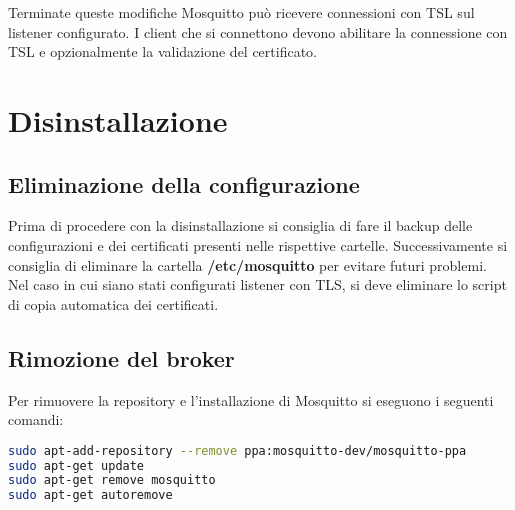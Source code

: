 Terminate queste modifiche Mosquitto può ricevere connessioni con TSL sul listener configurato.
I client che si connettono devono abilitare la connessione con TSL e opzionalmente la validazione del certificato.

\section{Disinstallazione}
\label{sub:broker-disinstallazione-del-broker}

\subsection{Eliminazione della configurazione}
\label{subsec:broker-eliminazione-configurazione}
Prima di procedere con la disinstallazione si consiglia di fare il backup delle configurazioni
e dei certificati presenti nelle rispettive cartelle.
Successivamente si consiglia di eliminare la cartella \textbf{/etc/mosquitto} per evitare futuri problemi.
Nel caso in cui siano stati configurati listener con TLS,
si deve eliminare lo script di copia automatica dei certificati.

\subsection{Rimozione del broker}
\label{subsec:broker-disinstallazione}
Per rimuovere la repository e l'installazione di Mosquitto si eseguono i seguenti comandi:
\begin{lstlisting}[language=bash]
sudo apt-add-repository --remove ppa:mosquitto-dev/mosquitto-ppa
sudo apt-get update
sudo apt-get remove mosquitto
sudo apt-get autoremove
\end{lstlisting}
